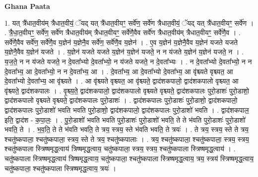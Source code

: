 \documentclass[17pt]{extarticle}
\begin{document}
\textbf{Ghana Paata } \newline

1. यत् त्रै॑धात॒वीय॑म् त्रैधात॒वीयं॒ ॅयद् यत् त्रै॑धात॒वीयꣳ॒॒ सर्वे॑ण॒ सर्वे॑ण त्रैधात॒वीयं॒ ॅयद् यत् त्रै॑धात॒वीयꣳ॒॒ सर्वे॑ण । . त्रै॒धा॒त॒वीयꣳ॒॒ सर्वे॑ण॒ सर्वे॑ण त्रैधात॒वीय॑म् त्रैधात॒वीयꣳ॒॒ सर्वे॑णै॒वैव सर्वे॑ण त्रैधात॒वीय॑म् त्रैधात॒वीयꣳ॒॒ सर्वे॑णै॒व । . सर्वे॑णै॒वैव सर्वे॑ण॒ सर्वे॑णै॒व य॒ज्ञेन॑ य॒ज्ञेनै॒व सर्वे॑ण॒ सर्वे॑णै॒व य॒ज्ञेन॑ । . ए॒व य॒ज्ञेन॑ य॒ज्ञेनै॒वैव य॒ज्ञेन॑ यजते यजते य॒ज्ञेनै॒वैव य॒ज्ञेन॑ यजते । . य॒ज्ञेन॑ यजते यजते य॒ज्ञेन॑ य॒ज्ञेन॑ यजते॒ न न य॑जते य॒ज्ञेन॑ य॒ज्ञेन॑ यजते॒ न । . य॒ज॒ते॒ न न य॑जते यजते॒ न दे॒वता᳚भ्यो दे॒वता᳚भ्यो॒ न य॑जते यजते॒ न दे॒वता᳚भ्यः । . न दे॒वता᳚भ्यो दे॒वता᳚भ्यो॒ न न दे॒वता᳚भ्य॒ आ दे॒वता᳚भ्यो॒ न न दे॒वता᳚भ्य॒ आ । . दे॒वता᳚भ्य॒ आ दे॒वता᳚भ्यो दे॒वता᳚भ्य॒ आ वृ॑श्च्यते वृश्च्यत॒ आ दे॒वता᳚भ्यो दे॒वता᳚भ्य॒ आ वृ॑श्च्यते । . आ वृ॑श्च्यते वृश्च्यत॒ आ वृ॑श्च्यते॒ द्वाद॑शकपालो॒ द्वाद॑शकपालो वृश्च्यत॒ आ वृ॑श्च्यते॒ द्वाद॑शकपालः । . वृ॒श्च्य॒ते॒ द्वाद॑शकपालो॒ द्वाद॑शकपालो वृश्च्यते वृश्च्यते॒ द्वाद॑शकपालः पुरो॒डाशः॑ पुरो॒डाशो॒ द्वाद॑शकपालो वृश्च्यते वृश्च्यते॒ द्वाद॑शकपालः पुरो॒डाशः॑ । . द्वाद॑शकपालः पुरो॒डाशः॑ पुरो॒डाशो॒ द्वाद॑शकपालो॒ द्वाद॑शकपालः पुरो॒डाशो॑ भवति भवति पुरो॒डाशो॒ द्वाद॑शकपालो॒ द्वाद॑शकपालः पुरो॒डाशो॑ भवति । . द्वाद॑शकपाल॒ इति॒ द्वाद॑श - क॒पा॒लः॒ । . पु॒रो॒डाशो॑ भवति भवति पुरो॒डाशः॑ पुरो॒डाशो॑ भवति॒ ते ते भ॑वति पुरो॒डाशः॑ पुरो॒डाशो॑ भवति॒ ते । . भ॒व॒ति॒ ते ते भ॑वति भवति॒ ते त्रय॒ स्त्रय॒ स्ते भ॑वति भवति॒ ते त्रयः॑ । . ते त्रय॒ स्त्रय॒ स्ते ते त्रय॒ श्चतु॑ष्कपाला॒ श्चतु॑ष्कपाला॒ स्त्रय॒ स्ते ते त्रय॒ श्चतु॑ष्कपालाः । . त्रय॒ श्चतु॑ष्कपाला॒ श्चतु॑ष्कपाला॒ स्त्रय॒ स्त्रय॒ श्चतु॑ष्कपाला स्त्रिष्षमृद्ध॒त्वाय॑ त्रिष्षमृद्ध॒त्वाय॒ चतु॑ष्कपाला॒ स्त्रय॒ स्त्रय॒ श्चतु॑ष्कपाला स्त्रिष्षमृद्ध॒त्वाय॑ । . चतु॑ष्कपाला स्त्रिष्षमृद्ध॒त्वाय॑ त्रिष्षमृद्ध॒त्वाय॒ चतु॑ष्कपाला॒ श्चतु॑ष्कपाला स्त्रिष्षमृद्ध॒त्वाय॒ त्रय॒ स्त्रय॑ स्त्रिष्षमृद्ध॒त्वाय॒ चतु॑ष्कपाला॒ श्चतु॑ष्कपाला स्त्रिष्षमृद्ध॒त्वाय॒ त्रयः॑ । \newline
\end{document}
